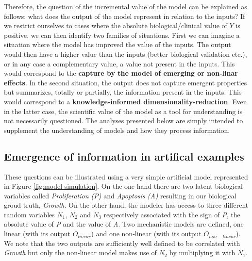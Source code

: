 \documentclass[a4paper,12pt,twoside,onecolumn,openright,final,oldfontcommands]{memoir}
\begin{document}
Therefore, the question of the incremental value of the model can be
explained as follows: what does the output of the model represent in
relation to the inputs? If we restrict ourselves to cases where the
absolute biological/clinical value of \(Y\) is positive, we can then
identify two families of situations. First we can imagine a situation
where the model has improved the value of the inputs. The output would
then have a higher value than the inputs (better biological validation
etc.), or in any case a complementary value, a value not present in the
inputs. This would correspond to the \textbf{capture by the model of
emerging or non-linar effects}. In the second situation, the output does
not capture emergent properties but summarizes, totally or partially,
the information present in the inputs. This would correspond to a
\textbf{knowledge-informed dimensionality-reduction}. Even in the latter
case, the scientific value of the model as a tool for understanding is
not necessarily questioned. The analyses presented below are simply
intended to supplement the understanding of models and how they process
information.

\subsection{Emergence of information in artifical
examples}\label{emergence-of-information-in-artifical-examples}

These questions can be illustrated using a very simple artificial model
represented in Figure \ref{fig:model-simulation}. On the one hand there
are two latent biological variables called \emph{Proliferation (P)} and
\emph{Apoptosis (A)} resulting in our biological groud truth,
\emph{Growth}. On the other hand, the modeler has access to three
different random variables \(N_1\), \(N_2\) and \(N_3\) respectively
associated with the sign of \emph{P}, the absolute value of \emph{P} and
the value of \emph{A}. Two mechanistic models are defined, one linear
(with its output \(O_{linear}\)) and one non-linear (with its output
\(O_{non-linear}\)). We note that the two outputs are sufficiently well
defined to be correlated with \emph{Growth} but only the non-linear
model makes use of \(N_2\) by multiplying it with \(N_1\).
\end{document}
